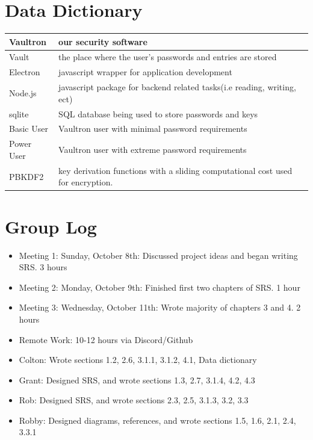 \documentclass[11pt]{report}
\begin{document}
\begin{appendices}
    \chapter{Data Dictionary}

    \tabulinesep=1.2mm
    \begin{tabu} to 0.97\textwidth { | X[l] | X[l] | }
        \hline
        Vaultron & our security software  \\
        \hline
        Vault & the place where the user's passwords and entries are stored  \\
        \hline
        Electron  & javascript wrapper for application development  \\
        \hline
        Node.js  & javascript package for backend related tasks(i.e reading, writing, ect) \\
        \hline
        sqlite  & SQL database being used to store passwords and keys\\
        \hline
        Basic User  & Vaultron user with minimal password requirements \\
        \hline
        Power User  & Vaultron user with extreme password requirements \\
        \hline
        PBKDF2 &  key derivation functions with a sliding computational cost used for encryption. \\
        \hline
    \end{tabu}


    \chapter{Group Log}
    \begin{itemize}
        \item Meeting 1: Sunday, October 8th: Discussed project ideas and began writing SRS. 3 hours
        \item Meeting 2: Monday, October 9th: Finished first two chapters of SRS. 1 hour
        \item Meeting 3: Wednesday, October 11th: Wrote majority of chapters 3 and 4. 2 hours
        \item Remote Work: 10-12 hours via Discord/Github
        \item Colton: Wrote sections 1.2, 2.6, 3.1.1, 3.1.2, 4.1, Data dictionary
        \item Grant: Designed SRS, and wrote sections 1.3, 2.7, 3.1.4, 4.2, 4.3
        \item Rob: Designed SRS, and wrote sections 2.3, 2.5, 3.1.3, 3.2, 3.3
        \item Robby: Designed diagrams, references, and wrote sections 1.5, 1.6, 2.1, 2.4, 3.3.1
    \end{itemize}


\end{appendices}
\end{document}

